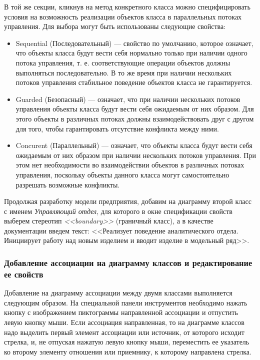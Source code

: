 \documentclass[a4paper,12pt]{report}
\begin{document}
В той же секции, кликнув на метод конкретного класса можно специфицировать условия на возможность реализации объектов класса в параллельных потоках управления. Для выбора могут быть использованы следующие свойства:
\begin{itemize}
	\item Sequential (Последовательный) --- свойство по умолчанию, которое означает, что объекты класса будут вести себя нормально только при наличии одного потока управления, т. е. соответствующие операции объектов должны выполняться последовательно. В то же время при наличии нескольких потоков управления стабильное поведение объектов класса не гарантируется.
	\item Guarded (Безопасный) --- означает, что при наличии нескольких потоков управления объекты класса будут вести себя ожидаемым от них образом. Для этого объекты в различных потоках должны взаимодействовать друг с другом для того, чтобы гарантировать отсутствие конфликта между ними.
	\item Concurent (Параллельный) --- означает, что объекты класса будут вести себя ожидаемым от них образом при наличии нескольких потоков управления. При этом нет необходимости во взаимодействии объектов в различных потоках управления, поскольку объекты данного класса могут  самостоятельно разрешать возможные конфликты.
\end{itemize}
Продолжая разработку модели предприятия, добавим на диаграмму второй класс с именем \textit{Управляющий отдел}, для которого в окне спецификации свойств выберем стереотип \textit{<<boundary>>} (граничный класс), а в качестве документации введем текст: <<Реализует поведение аналитического отдела. Инициирует работу над новым изделием и вводит изделие в модельный ряд>>.


\subsubsection*{Добавление ассоциации на диаграмму классов и редактирование ее свойств}
Добавление на диаграмму ассоциации между двумя классами выполняется следующим образом. На специальной панели инструментов необходимо нажать кнопку с изображением пиктограммы направленной ассоциации и отпустить левую кнопку мыши. Если ассоциация направленная, то на диаграмме классов надо выделить первый элемент ассоциации или источник, от которого исходит стрелка, и, не отпуская нажатую левую кнопку мыши, переместить ее указатель ко второму элементу отношения или приемнику, к которому направлена стрелка.
\end{document}
